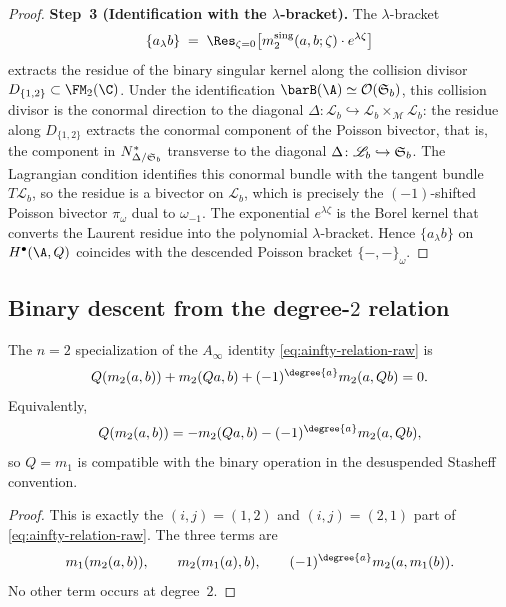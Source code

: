 \begin{proof}
\smallskip
\noindent\textbf{Step~3 (Identification with the $\lambda$-bracket).}
The $\lambda$-bracket
\[
\{a_\lambda b\}
\;=\;
\Res_{\zeta=0}\bigl[m_2^{\mathrm{sing}}(a,b;\zeta)\cdot e^{\lambda\zeta}\bigr]
\]
extracts the residue of the binary singular kernel along the collision
divisor $D_{\{1,2\}} \subset \FM_2(\C)$. Under the identification
$\barB(\A) \simeq \mathcal{O}(\Steinb_b)$, this collision divisor is
the conormal direction to the diagonal
$\Delta \colon \mathscr{L}_b \hookrightarrow
\mathscr{L}_b \times_{\mathscr{M}} \mathscr{L}_b$:
the residue along $D_{\{1,2\}}$ extracts the conormal component
of the Poisson bivector, that is, the component in
$N^*_{\Delta/\mathfrak{S}_b}$ transverse to the diagonal
$\Delta \colon \mathscr{L}_b \hookrightarrow \mathfrak{S}_b$.
The Lagrangian condition identifies this conormal bundle with the
tangent bundle $T\mathscr{L}_b$, so the residue is a bivector on
$\mathscr{L}_b$, which is precisely the $(-1)$-shifted Poisson
bivector $\pi_\omega$ dual to $\omega_{-1}$.
The exponential $e^{\lambda\zeta}$ is the Borel kernel that converts
the Laurent residue into the polynomial $\lambda$-bracket.
Hence $\{a_\lambda b\}$ on $H^\bullet(\A,Q)$ coincides with the
descended Poisson bracket $\{-,-\}_{\omega}$.
\end{proof}

\subsection{Binary descent from the degree-$2$ relation}

\begin{proposition}
\label{prop:m1_m2}
The $n=2$ specialization of the $A_\infty$ identity \eqref{eq:ainfty-relation-raw} is
\begin{equation}
\label{eq:repaired-n2}
Q(m_2(a,b))+m_2(Qa,b)+(-1)^{\degree{a}}m_2(a,Qb)=0.
\end{equation}
Equivalently,
\[
Q(m_2(a,b))=-m_2(Qa,b)-(-1)^{\degree{a}}m_2(a,Qb),
\]
so \(Q=m_1\) is compatible with the binary operation in the
desuspended Stasheff convention.
\end{proposition}

\begin{proof}
This is exactly the $(i,j)=(1,2)$ and $(i,j)=(2,1)$ part of
\eqref{eq:ainfty-relation-raw}. The three terms are
\[
m_1(m_2(a,b)),\qquad m_2(m_1(a),b),\qquad
(-1)^{\degree{a}}m_2(a,m_1(b)).
\]
No other term occurs at degree~$2$.
\end{proof}

